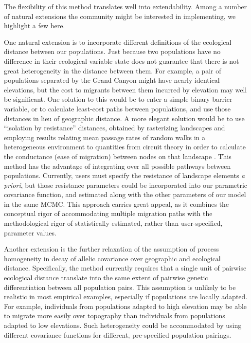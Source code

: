 The flexibility of this method translates well into extendability.  Among a number of natural extensions the community might be interested in implementing, we highlight a few here.  

One natural extension is to incorporate different definitions of the ecological distance between our populations. 
Just because two populations have no difference in their ecological variable state does not guarantee that there is not great heterogeneity in the distance between them.  For example, a pair of populations separated by the Grand Canyon might have nearly identical elevations, but the cost to migrants between them incurred by elevation may well be significant.  
One solution to this would be to enter a simple binary barrier variable, or
to calculate least-cost paths between populations, and use those distances in lieu of geographic distance.  
A more elegant solution would be to use ``isolation by resistance'' distances,
obtained by rasterizing landscapes and employing results relating mean passage rates of random walks in a heterogeneous environment to quantities from circuit theory in order to calculate the conductance (ease of migration) between nodes on that landscape \citep{McRaeBeier2007}.  This method has the advantage of integrating over all possible pathways between populations.
Currently, users must specify the resistance of landscape elements \emph{a priori}, but those resistance parameters could be incorporated into our parametric covariance function, and estimated along with the other parameters of our model in the same MCMC.  This approach carries great appeal, as it combines the conceptual rigor of accommodating multiple migration paths with the methodological rigor of statistically estimated, rather than user-specified, parameter values.  

Another extension is the further relaxation of the assumption of process homogeneity in decay of allelic covariance over geographic and ecological distance.  Specifically, the method currently requires that a single unit of pairwise ecological distance translate into the same extent of pairwise genetic differentiation between all population pairs.  This assumption is unlikely to be realistic in most empirical examples, especially if populations are locally adapted.  For example, individuals from populations adapted to high elevation may be able to migrate more easily over topography than individuals from populations adapted to low elevations.  Such heterogeneity could be accommodated by using different covariance functions for different, pre-specified population pairings.  

